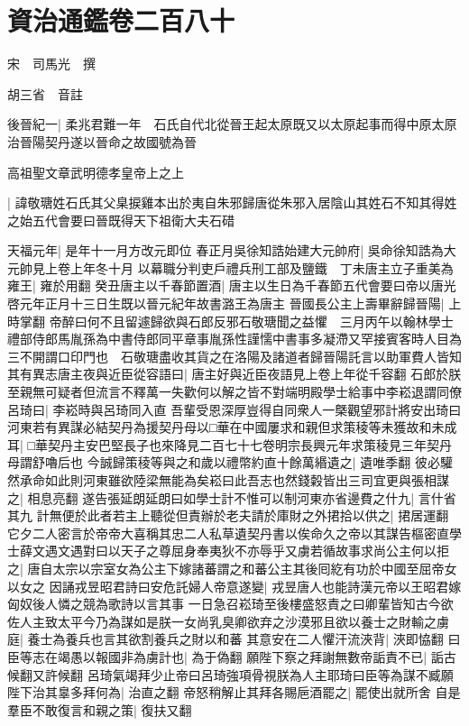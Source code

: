 \chapter{資治通鑑卷二百八十}
宋　司馬光　撰

胡三省　音註

後晉紀一|{
	柔兆君難一年　石氏自代北從晉王起太原既又以太原起事而得中原太原治晉陽契丹遂以晉命之故國號為晉}


高祖聖文章武明德孝皇帝上之上

|{
	諱敬瑭姓石氏其父臬捩雞本出於夷自朱邪歸唐從朱邪入居陰山其姓石不知其得姓之始五代會要曰晉既得天下祖衛大夫石碏}


天福元年|{
	是年十一月方改元即位}
春正月吳徐知誥始建大元帥府|{
	吳命徐知誥為大元帥見上卷上年冬十月}
以幕職分判吏戶禮兵刑工部及鹽鐵　丁未唐主立子重美為雍王|{
	雍於用翻}
癸丑唐主以千春節置酒|{
	唐主以生日為千春節五代會要曰帝以唐光啓元年正月十三日生既以晉元紀年故書潞王為唐主}
晉國長公主上壽畢辭歸晉陽|{
	上時掌翻}
帝醉曰何不且留遽歸欲與石郎反邪石敬瑭聞之益懼　三月丙午以翰林學士禮部侍郎馬胤孫為中書侍郎同平章事胤孫性謹懦中書事多凝滯又罕接賓客時人目為三不開謂口印門也　石敬瑭盡收其貨之在洛陽及諸道者歸晉陽託言以助軍費人皆知其有異志唐主夜與近臣從容語曰|{
	唐主好與近臣夜語見上卷上年從千容翻}
石郎於朕至親無可疑者但流言不釋萬一失歡何以解之皆不對端明殿學士給事中李崧退謂同僚呂琦曰|{
	李崧時與呂琦同入直}
吾輩受恩深厚豈得自同衆人一槩觀望邪計將安出琦曰河東若有異謀必結契丹為援契丹母以□華在中國屢求和親但求策稜等未獲故和未成耳|{
	□華契丹主安巴堅長子也來降見二百七十七卷明宗長興元年求策稜見三年契丹母謂舒嚕后也}
今誠歸策稜等與之和歲以禮幣約直十餘萬緡遺之|{
	遺唯季翻}
彼必驩然承命如此則河東雖欲陸梁無能為矣崧曰此吾志也然錢糓皆出三司宜更與張相謀之|{
	相息亮翻}
遂告張延朗延朗曰如學士計不惟可以制河東亦省邊費之什九|{
	言什省其九}
計無便於此者若主上聽從但責辦於老夫請於庫財之外捃拾以供之|{
	捃居運翻}
它夕二人密言於帝帝大喜稱其忠二人私草遺契丹書以俟命久之帝以其謀告樞密直學士薛文遇文遇對曰以天子之尊屈身奉夷狄不亦辱乎又虜若循故事求尚公主何以拒之|{
	唐自太宗以宗室女為公主下嫁諸蕃謂之和蕃公主其後囘紇有功於中國至屈帝女以女之}
因誦戎昱昭君詩曰安危託婦人帝意遂變|{
	戎昱唐人也能詩漢元帝以王昭君嫁匈奴後人憐之競為歌詩以言其事}
一日急召崧琦至後樓盛怒責之曰卿輩皆知古今欲佐人主致太平今乃為謀如是朕一女尚乳臭卿欲弃之沙漠邪且欲以養士之財輸之虜庭|{
	養士為養兵也言其欲割養兵之財以和蕃}
其意安在二人懼汗流浹背|{
	浹即恊翻}
曰臣等志在竭愚以報國非為虜計也|{
	為于偽翻}
願陛下察之拜謝無數帝詬責不已|{
	詬古候翻又許候翻}
呂琦氣竭拜少止帝曰呂琦強項骨視朕為人主耶琦曰臣等為謀不臧願陛下治其辠多拜何為|{
	治直之翻}
帝怒稍解止其拜各賜巵酒罷之|{
	罷使出就所舍}
自是羣臣不敢復言和親之策|{
	復扶又翻}
